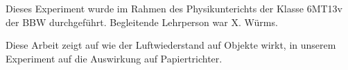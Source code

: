 Dieses Experiment wurde im Rahmen des Physikunterichts der Klasse 6MT13v der BBW durchgeführt. Begleitende Lehrperson war X. Würms.

Diese Arbeit zeigt auf wie der Luftwiederstand auf Objekte wirkt, in unserem Experiment auf die Auswirkung auf Papiertrichter.